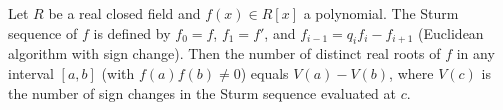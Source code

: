 Let $R$ be a real closed field and $f(x) \in R[x]$ a polynomial. The Sturm sequence of $f$ is defined by $f_0 = f$, $f_1 = f'$, and $f_{i-1} = q_i f_i - f_{i+1}$ (Euclidean algorithm with sign change). Then the number of distinct real roots of $f$ in any interval $[a, b]$ (with $f(a)f(b) \neq 0$) equals $V(a) - V(b)$, where $V(c)$ is the number of sign changes in the Sturm sequence evaluated at $c$.
